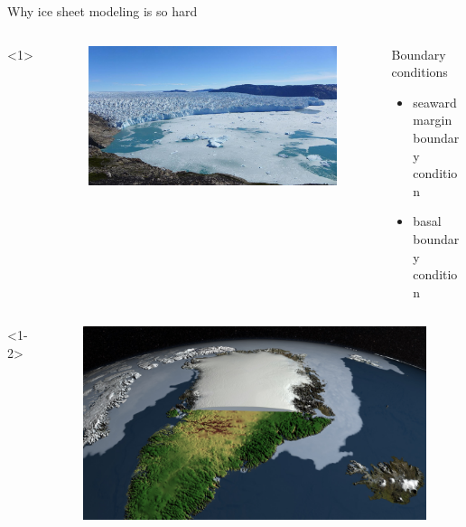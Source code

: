 \documentclass[hide notes,intlimits]{beamer}
\begin{document}
\begin{frame}{Why ice sheet modeling is so hard}
    \begin{columns}[c]<1>
      \begin{column}{.28\linewidth}
        \begin{figure}
          \includegraphics[width=\linewidth]{storeglacier}
        \end{figure}
      \end{column}
      \begin{column}{.67\linewidth}
        \begin{block}{Boundary conditions}
        \begin{itemize}
        \item seaward margin boundary condition
        \item basal boundary condition
        \end{itemize}
      \end{block}
      \end{column}
    \end{columns}
    \begin{columns}[c]<1-2>
      \begin{column}{.28\linewidth}
        \begin{figure}
          \includegraphics[width=\linewidth]{canale_grande_V05}

\end{figure}
\end{column}
\end{columns}
\end{frame}
\end{document}
